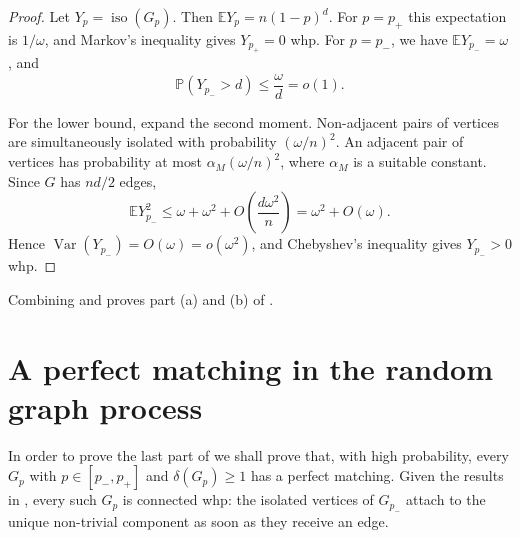 \documentclass[10pt,a4paper]{article}
\newcommand{\whp}{whp}
\newcommand{\iso}{\operatorname{iso}}
\begin{document}
\begin{proof}
Let $Y_p=\iso(G_p)$.
Then $\mathbb{E}Y_p=n(1-p)^d$.
For $p=p_+$ this expectation is $1/\omega$, and Markov's inequality gives $Y_{p_+}=0$ \whp.
For $p=p_-$, we have $\mathbb{E}Y_{p_-}=\omega$, and
\[
  \mathbb{P}(Y_{p_-}>d)\le\frac{\omega}{d}=o(1).
\]

For the lower bound, expand the second moment.
Non-adjacent pairs of vertices are simultaneously isolated with probability $(\omega/n)^2$. An adjacent pair of vertices has probability at most $\alpha_M(\omega/n)^2$, where $\alpha_M$ is a suitable constant.
Since $G$ has $nd/2$ edges,
\[
  \mathbb{E}Y_{p_-}^2
  \le \omega+\omega^2+O\left(\frac{d\omega^2}{n}\right)
  =\omega^2+O(\omega).
\]
Hence $\operatorname{Var}(Y_{p_-})=O(\omega)=o(\omega^2)$, and Chebyshev's inequality gives $Y_{p_-}>0$ \whp.
\end{proof}

Combining  and  proves part (a) and (b) of .



\section{A perfect matching in the random graph process}\label{s:matching}

In order to prove the last part of  we shall prove that, with high probability, every
$G_p$ with $p\in[p_-,p_+]$ and $\delta(G_p)\ge1$ has a perfect matching.
Given the results in , every such $G_p$ is connected whp:
the isolated vertices of $G_{p_-}$ attach to the unique non-trivial component as soon as they receive an edge.
\end{document}
